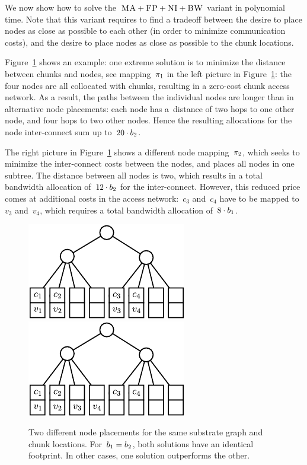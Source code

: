 We now show how to solve the~$\textsc{MA}+\textsc{FP}+\textsc{NI}+\textsc{BW}$ variant
in polynomial time.
Note that this variant requires to find a
tradeoff between the desire to place nodes as close as possible to each other
(in order to minimize communication costs), and the desire to place nodes
as close as possible to
the chunk locations.




 Figure~\ref{fig:dynamic_motivation} shows an example: one
extreme solution is to minimize the distance between chunks and nodes,
see mapping~$\pi_1$ in the left picture in
Figure~\ref{fig:dynamic_motivation}: the four nodes are all
collocated with chunks, resulting in a zero-cost chunk access network. As a
result, the paths between the individual nodes are longer than in alternative
node placements: each node has a~distance of two hops to one other node,
and four hops to two other nodes. Hence the resulting allocations for the
node inter-connect sum up to~$20 \cdot b_2$.


The right picture in Figure~\ref{fig:dynamic_motivation} shows a different node
mapping~$\pi_2$, which seeks to minimize the inter-connect costs
between the nodes, and places all nodes in one subtree. The distance between all
nodes is two, which results in a total bandwidth allocation of~$12\cdot b_2$
for the inter-connect. However, this reduced price comes at additional costs in
the access network:~$c_3$ and~$c_4$ have to be mapped to~$v_3$ and~$v_4$,
which requires a total bandwidth allocation of~$8 \cdot b_1$.


\begin{figure}
  \centering
\includegraphics[width = 0.39\columnwidth]{figs/static-mapping/dynamic_bad}
\hspace{1cm}
\centering
\includegraphics[width = 0.39\columnwidth]{figs/static-mapping/dynamic_good}
\caption{Two different node placements for the same substrate graph and chunk
locations. For~$b_1 = b_2$, both solutions have an identical
footprint. In other cases, one solution outperforms the other.}
\label{fig:dynamic_motivation}
\vspace{-1em}
\end{figure}



